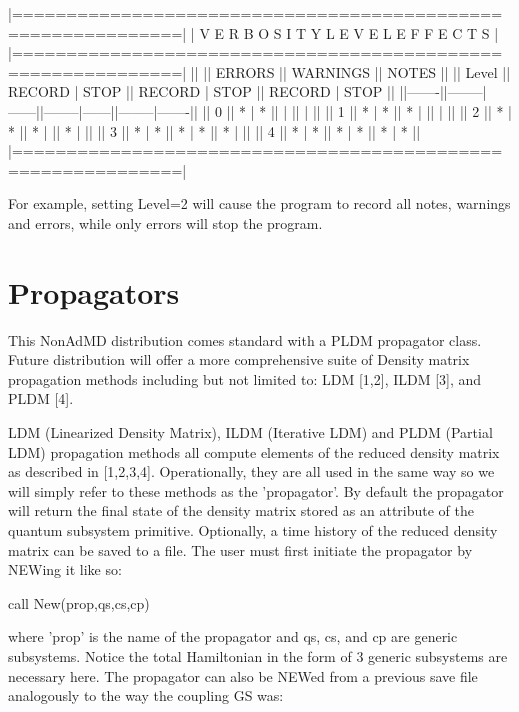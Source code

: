  \par
 \begin{DoxyVerb}|=============================================================|
|         V E R B O S I T Y   L E V E L   E F F E C T S       |
|=============================================================|
||       ||     ERRORS    ||     WARNINGS  ||      NOTES     ||
|| Level || RECORD | STOP || RECORD | STOP || RECORD | STOP  ||
||-------||--------|------||--------|------||--------|-------||
||   0   ||   *    |  *   ||        |      ||        |       ||
||   1   ||   *    |  *   ||   *    |      ||        |       ||
||   2   ||   *    |  *   ||   *    |      ||   *    |       ||
||   3   ||   *    |  *   ||   *    |  *   ||   *    |       ||
||   4   ||   *    |  *   ||   *    |  *   ||   *    |   *   ||
|=============================================================|
\end{DoxyVerb}
 For example, setting Level=2 will cause the program to record all notes, warnings and errors, while only errors will stop the program.\par
 \hypertarget{_interface_Propagators}{}\section{Propagators}\label{_interface_Propagators}
This Non\-Ad\-M\-D distribution comes standard with a P\-L\-D\-M propagator class. Future distribution will offer a more comprehensive suite of Density matrix propagation methods including but not limited to\-: L\-D\-M \mbox{[}1,2\mbox{]}, I\-L\-D\-M \mbox{[}3\mbox{]}, and P\-L\-D\-M \mbox{[}4\mbox{]}.\par
 \par
 L\-D\-M (Linearized Density Matrix), I\-L\-D\-M (Iterative L\-D\-M) and P\-L\-D\-M (Partial L\-D\-M) propagation methods all compute elements of the reduced density matrix as described in \mbox{[}1,2,3,4\mbox{]}. Operationally, they are all used in the same way so we will simply refer to these methods as the 'propagator'. By default the propagator will return the final state of the density matrix stored as an attribute of the quantum subsystem primitive. Optionally, a time history of the reduced density matrix can be saved to a file. The user must first initiate the propagator by N\-E\-Wing it like so\-:\par
 \par
 call New(prop,qs,cs,cp)\par
 \par
 where 'prop' is the name of the propagator and qs, cs, and cp are generic subsystems. Notice the total Hamiltonian in the form of 3 generic subsystems are necessary here. The propagator can also be N\-E\-Wed from a previous save file analogously to the way the coupling G\-S was\-:\par
